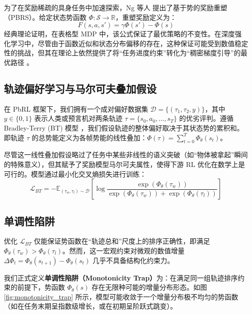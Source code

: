 为了在奖励稀疏的具身任务中加速探索，Ng 等人 \cite{ng1999policy} 提出了基于势的奖励重塑（PBRS）。给定状态势函数 $\Phi: \mathcal{S} \to \mathbb{R}$，重塑奖励定义为：
\begin{equation}
\label{eq:pbrs}
    F(s, a, s') = \gamma \Phi(s') - \Phi(s)
\end{equation}
经典理论证明，在表格型 MDP 中，该公式保证了最优策略的不变性。在深度强化学习中，尽管由于函数近似和状态分布偏移的存在，这种保证可能受到数值稳定性的挑战，但其在理论上依然提供了将“任务进度约束”转化为“稠密梯度引导”的最优路径 \cite{muller2025improving}。

\subsection{轨迹偏好学习与马尔可夫叠加假设}

在 PbRL 框架下，我们拥有一个成对偏好数据集 $\mathcal{D} = \{(\tau_1, \tau_2, y)\}$，其中 $y \in \{0, 1\}$ 表示人类或预言机对两条轨迹 $\tau = \{s_0, a_0, \dots, s_T\}$ 的优劣评判。遵循 Bradley-Terry (BT) 模型 \cite{bradley1952, christiano2017deep}，我们假设轨迹的整体偏好取决于其状态势的累积和。即轨迹 $\tau$ 的总势能定义为各帧势能的线性叠加：$\Phi(\tau) = \sum_{t=0}^T \Phi_\theta(s_t)$。

尽管这一线性叠加假设略过了任务中某些非线性的语义突破（如“物体被拿起”瞬间的特殊意义），但其赋予了奖励模型马尔可夫属性，使得下游 RL 优化在数学上是可行的。模型通过最小化交叉熵损失进行训练：
\begin{equation}
\label{eq:bt}
    \mathcal{L}_{BT} = - \mathbb{E}_{(\tau_w, \tau_l) \sim \mathcal{D}} \left[ \log \frac{\exp(\Phi_\theta(\tau_w))}{\exp(\Phi_\theta(\tau_w)) + \exp(\Phi_\theta(\tau_l))} \right]
\end{equation}

\subsection{单调性陷阱}

优化 $\mathcal{L}_{BT}$ 仅能保证势函数在“轨迹总和”尺度上的排序正确性，即满足 $\Phi_\theta(\tau_w) > \Phi_\theta(\tau_l)$。然而，这一宏观约束对微观的数值增量 $\Delta \Phi_t = \Phi_\theta(s_{t+1}) - \Phi_\theta(s_t)$ 几乎不具备结构化约束力。

我们正式定义\textbf{单调性陷阱（Monotonicity Trap）}为：在满足同一组轨迹排序约束的前提下，势函数 $\Phi_\theta(s)$ 存在无限种可能的增量分布形态。如图 \ref{fig:monotonicity_trap} 所示，模型可能收敛于一个增量分布极不均匀的势函数（如在任务末期呈指数级增长，或在初期呈阶跃式跳变）。

